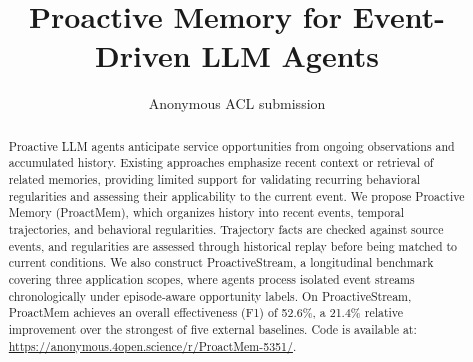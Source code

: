 \documentclass[11pt]{article}
\title{Proactive Memory for Event-Driven LLM Agents}
\author{Anonymous ACL submission}
\newcommand{\system}{ProactMem}
\begin{document}
\maketitle

\begin{abstract}
Proactive LLM agents anticipate service opportunities from ongoing observations and accumulated history.
Existing approaches emphasize recent context or retrieval of related memories, providing limited support for validating recurring behavioral regularities and assessing their applicability to the current event.
We propose Proactive Memory (\system{}), which organizes history into recent events, temporal trajectories, and behavioral regularities.
Trajectory facts are checked against source events, and regularities are assessed through historical replay before being matched to current conditions.
We also construct ProactiveStream, a longitudinal benchmark covering three application scopes, where agents process isolated event streams chronologically under episode-aware opportunity labels.
On ProactiveStream, \system{} achieves an overall effectiveness (F1) of 52.6\%, a 21.4\% relative improvement over the strongest of five external baselines.
Code is available at: \href{https://anonymous.4open.science/r/ProactMem-5351/}{https://anonymous.4open.science/r/ProactMem-5351/}.
\end{abstract}








\FloatBarrier

\label{sec:main_end}



\begingroup
\let\paperbibliography\thebibliography
\renewcommand{\thebibliography}[1]{%
  \paperbibliography{#1}%
  \setlength{\rightskip}{0pt plus 2em}}

\endgroup
\clearpage
\appendix


\end{document}
